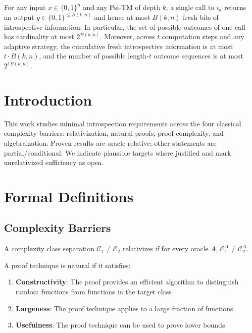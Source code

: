 
\begin{lemma}
\label{lem:one-step-budget-3}
For any input $x\in\{0,1\}^n$ and any Psi-TM of depth $k$, a single call to $\iota_k$ returns an output $y\in\{0,1\}^{\le B(k,n)}$ and hence at most $B(k,n)$ fresh bits of introspective information. In particular, the set of possible outcomes of one call has cardinality at most $2^{B(k,n)}$. Moreover, across $t$ computation steps and any adaptive strategy, the cumulative fresh introspective information is at most $t\cdot B(k,n)$, and the number of possible length-$t$ outcome sequences is at most $2^{t\,B(k,n)}$.
\end{lemma}

\section{Introduction}

This work studies minimal introspection requirements across the four classical complexity barriers: relativization, natural proofs, proof complexity, and algebraization. Proven results are oracle-relative; other statements are partial/conditional. We indicate plausible targets where justified and mark unrelativized sufficiency as open.

\section{Formal Definitions}

\subsection{Complexity Barriers}

\begin{definition}
A complexity class separation $\mathcal{C}_1 \neq \mathcal{C}_2$ relativizes if for every oracle $A$, $\mathcal{C}_1^A \neq \mathcal{C}_2^A$.
\end{definition}

\begin{definition}
A proof technique is natural if it satisfies:
\begin{enumerate}
\item \textbf{Constructivity}: The proof provides an efficient algorithm to distinguish random functions from functions in the target class
\item \textbf{Largeness}: The proof technique applies to a large fraction of functions
\item \textbf{Usefulness}: The proof technique can be used to prove lower bounds
\end{enumerate}
\end{definition}

